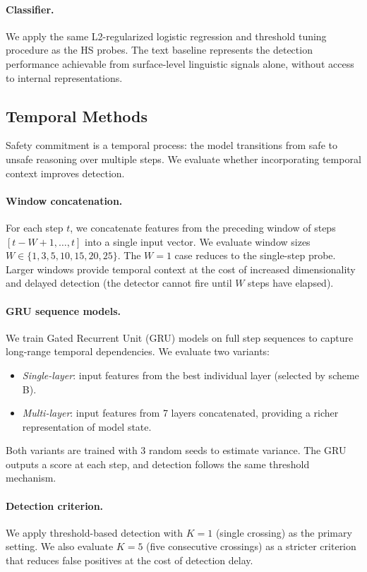 \paragraph{Classifier.} We apply the same L2-regularized logistic regression and threshold tuning procedure as the HS probes. The text baseline represents the detection performance achievable from surface-level linguistic signals alone, without access to internal representations.

\subsection{Temporal Methods}
\label{sec:temporal}

Safety commitment is a temporal process: the model transitions from safe to unsafe reasoning over multiple steps. We evaluate whether incorporating temporal context improves detection.

\paragraph{Window concatenation.} For each step $t$, we concatenate features from the preceding window of steps $[t-W+1, \ldots, t]$ into a single input vector. We evaluate window sizes $W \in \{1, 3, 5, 10, 15, 20, 25\}$. The $W=1$ case reduces to the single-step probe. Larger windows provide temporal context at the cost of increased dimensionality and delayed detection (the detector cannot fire until $W$ steps have elapsed).

\paragraph{GRU sequence models.} We train Gated Recurrent Unit (GRU) models on full step sequences to capture long-range temporal dependencies. We evaluate two variants:
\begin{itemize}
    \item \emph{Single-layer}: input features from the best individual layer (selected by scheme B).
    \item \emph{Multi-layer}: input features from 7 layers concatenated, providing a richer representation of model state.
\end{itemize}
Both variants are trained with 3 random seeds to estimate variance. The GRU outputs a score at each step, and detection follows the same threshold mechanism.

\paragraph{Detection criterion.} We apply threshold-based detection with $K=1$ (single crossing) as the primary setting. We also evaluate $K=5$ (five consecutive crossings) as a stricter criterion that reduces false positives at the cost of detection delay.

